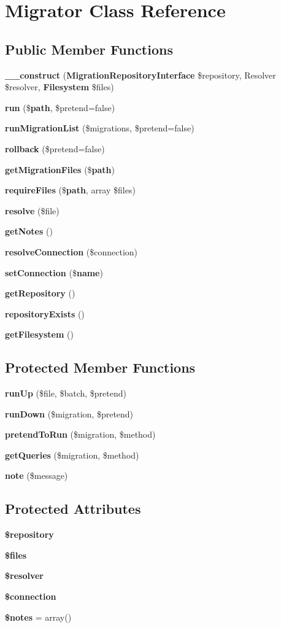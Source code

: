 \section{Migrator Class Reference}
\label{class_illuminate_1_1_database_1_1_migrations_1_1_migrator}
\subsection*{Public Member Functions}
\begin{DoxyCompactItemize}
\item 
{\bf \+\_\+\+\_\+construct} ({\bf Migration\+Repository\+Interface} \$repository, Resolver \$resolver, {\bf Filesystem} \$files)
\item 
{\bf run} (\${\bf path}, \$pretend=false)
\item 
{\bf run\+Migration\+List} (\$migrations, \$pretend=false)
\item 
{\bf rollback} (\$pretend=false)
\item 
{\bf get\+Migration\+Files} (\${\bf path})
\item 
{\bf require\+Files} (\${\bf path}, array \$files)
\item 
{\bf resolve} (\$file)
\item 
{\bf get\+Notes} ()
\item 
{\bf resolve\+Connection} (\$connection)
\item 
{\bf set\+Connection} (\${\bf name})
\item 
{\bf get\+Repository} ()
\item 
{\bf repository\+Exists} ()
\item 
{\bf get\+Filesystem} ()
\end{DoxyCompactItemize}
\subsection*{Protected Member Functions}
\begin{DoxyCompactItemize}
\item 
{\bf run\+Up} (\$file, \$batch, \$pretend)
\item 
{\bf run\+Down} (\$migration, \$pretend)
\item 
{\bf pretend\+To\+Run} (\$migration, \$method)
\item 
{\bf get\+Queries} (\$migration, \$method)
\item 
{\bf note} (\$message)
\end{DoxyCompactItemize}
\subsection*{Protected Attributes}
\begin{DoxyCompactItemize}
\item 
{\bf \$repository}
\item 
{\bf \$files}
\item 
{\bf \$resolver}
\item 
{\bf \$connection}
\item 
{\bf \$notes} = array()
\end{DoxyCompactItemize}


